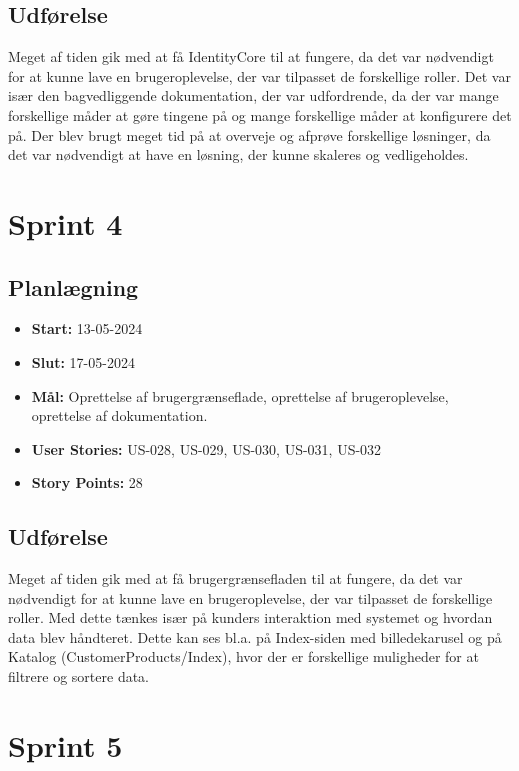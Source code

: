 \subsection{Udførelse}
\label{subsec:sprint-3-udforelse}
Meget af tiden gik med at få IdentityCore til at fungere, da det var nødvendigt for at kunne lave en brugeroplevelse, der var tilpasset de forskellige roller.
Det var især den bagvedliggende dokumentation, der var udfordrende, da der var mange forskellige måder at gøre tingene på og mange forskellige måder at konfigurere det på.
Der blev brugt meget tid på at overveje og afprøve forskellige løsninger, da det var nødvendigt at have en løsning, der kunne skaleres og vedligeholdes.

\section{Sprint 4}
\label{sec:sprint-4}
\subsection{Planlægning}
\label{subsec:sprint-4-plan}
\begin{itemize}
    \item \textbf{Start:} 13-05-2024
    \item \textbf{Slut:} 17-05-2024
    \item \textbf{Mål:} Oprettelse af brugergrænseflade, oprettelse af brugeroplevelse, oprettelse af dokumentation.
    \item \textbf{User Stories:} US-028, US-029, US-030, US-031, US-032
    \item \textbf{Story Points:} 28
\end{itemize}

\subsection{Udførelse}
\label{subsec:sprint-4-udforelse}
Meget af tiden gik med at få brugergrænsefladen til at fungere, da det var nødvendigt for at kunne lave en brugeroplevelse, der var tilpasset de forskellige roller.
Med dette tænkes især på kunders interaktion med systemet og hvordan data blev håndteret. 
Dette kan ses bl.a. på Index-siden med billedekarusel og på Katalog (CustomerProducts/Index), hvor der er forskellige muligheder for at filtrere og sortere data.

\section{Sprint 5}
\label{sec:sprint-5}
